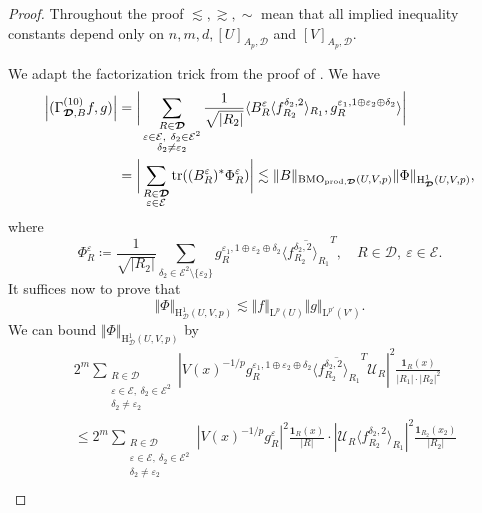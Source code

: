 \documentclass{article}
\theoremstyle{definition}
\theoremstyle{remark}
\numberwithin{equation}{section}
\newcommand{\cE}{\mathcal{E}}
\newcommand{\cU}{\mathcal{U}}
\newcommand{\bfD}{\bm{\mathcal{D}}}
\newcommand{\e}{\varepsilon}
\newcommand{\Lp}[1]{\mathrm{L}^{#1}}
\newcommand{\1}{\mathbf{1}}
\newcommand{\BMOprodD}{\ensuremath\text{BMO}_{\text{prod},\bfD}}
\begin{document}
    \begin{proof}
        Throughout the proof $\lesssim,\gtrsim,\sim$ mean that all implied inequality constants depend only on $n,m,d,[U]_{A_p,\bfD}$ and $[V]_{A_p,\bfD}.$

        We adapt the factorization trick from the proof of \cite[Proposition 6.1]{Holmes_Petermichl_Wick_2018}. We have
        \begin{align*}
            \left|(\Gamma_{\bfD,B}^{(10)}f,g)\right|&=\bigg|\sum_{\substack{R\in\bfD\\\e\in\cE,~\delta_2\in\cE^2\\\delta_2\neq\e_2}}\frac{1}{\sqrt{|R_2|}}\langle B_{R}^{\e}\langle f^{\delta_2,2}_{R_2}\rangle_{R_1},g_{R}^{\e_1,1\oplus\e_2\oplus\delta_2}\rangle\bigg|\\
            &=\bigg|\sum_{\substack{R\in\bfD\\\e\in\cE}}\mathrm{tr}((B_{R}^{\e})^{\ast}\Phi_{R}^{\e})\bigg|\lesssim\Vert B\Vert_{\BMOprodD(U,V,p)}\Vert\Phi\Vert_{\mathrm{H}^1_{\bfD}(U,V,p)},
        \end{align*}
        where
        \begin{equation*}
            \Phi_{R}^{\e}\coloneq \frac{1}{\sqrt{|R_2|}}\sum_{\delta_2\in\cE^2\setminus\{\e_2\}}g^{\e_1,1\oplus\e_2\oplus\delta_2}_{R}\overline{\langle f^{\delta_2,2}_{R_2}\rangle_{R_1}}^{T},\quad R\in\bfD,~\e\in\cE.
        \end{equation*}
        It suffices now to prove that
        \begin{equation}
            \label{goal1}
            \Vert\Phi\Vert_{\mathrm{H}^1_{\bfD}(U,V,p)}\lesssim\Vert f\Vert_{\Lp{p}(U)}\Vert g\Vert_{\Lp{p'}(V')}.
        \end{equation}
        We can bound $\Vert\Phi\Vert_{\mathrm{H}^1_{\bfD}(U,V,p)}$ by
        \begin{align*}
            & 2^{m}\sum_{\substack{R\in\bfD\\\e\in\cE,~\delta_2\in\cE^2\\\delta_2\neq\e_2}}|V(x)^{-1/p}g^{\e_1,1\oplus\e_2\oplus\delta_2}_{R}\overline{\langle f^{\delta_2,2}_{R_2}\rangle_{R_1}}^{T}\cU_{R}|^2\frac{\1_{R}(x)}{|R_1|\cdot|R_2|^2}\\
            &\leq 2^{m}\sum_{\substack{R\in\bfD\\\e\in\cE,~\delta_2\in\cE^2\\\delta_2\neq\e_2}}|V(x)^{-1/p}g^{\e}_{R}|^2\frac{\1_{R}(x)}{|R|}\cdot|\cU_{R}\langle f^{\delta_2,2}_{R_2}\rangle_{R_1}|^2\frac{\1_{R_2}(x_2)}{|R_2|}\\

\end{align*}
\end{proof}
\end{document}

